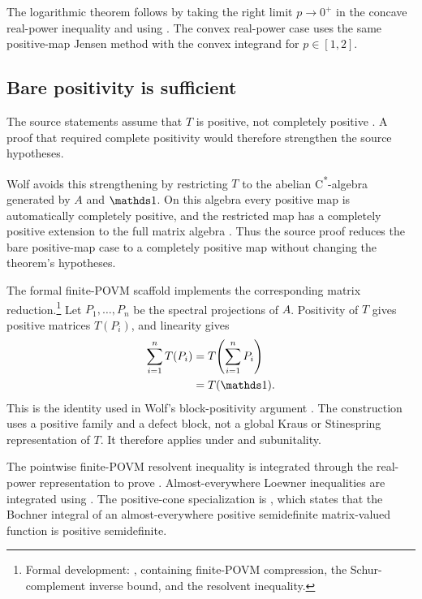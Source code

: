 \documentclass{article}
\begin{document}
The logarithmic theorem follows by taking the right limit $p\to 0^+$ in the
concave real-power inequality and using
. The convex real-power case uses the
same positive-map Jensen method with the convex integrand for $p\in[1,2]$.

\subsection{Bare positivity is sufficient}
\label{ssec:wolf_ch5_operator_jensen_lieb_bare_positivity}

The source statements assume that $T$ is positive, not completely positive
\cite[Corollary~5.2 and Theorems~5.10--5.13]{Wolf2012Quantum}. A proof that
required complete positivity would therefore strengthen the source
hypotheses.

Wolf avoids this strengthening by restricting $T$ to the abelian
C\textsuperscript{*}-algebra generated by $A$ and $\Id$. On this algebra every
positive map is automatically completely positive, and the restricted map has
a completely positive extension to the full matrix algebra
\cite[Propositions~1.6--1.7 and Theorems~5.10--5.13]{Wolf2012Quantum}. Thus
the source proof reduces the bare positive-map case to a completely positive
map without changing the theorem's hypotheses.

The formal finite-POVM scaffold implements the corresponding matrix
reduction.\footnote{Formal development:
, containing finite-POVM
compression, the Schur-complement inverse bound, and the resolvent inequality.}
Let $P_1,\ldots,P_n$ be the spectral projections of $A$. Positivity of $T$
gives positive matrices $T(P_i)$, and linearity gives
\begin{align}
    \sum_{i=1}^nT(P_i)
        &=T\!\left(\sum_{i=1}^nP_i\right)
    \label{eq:wolf_ch5_operator_jensen_lieb_povm_sum_first}\\
        &=T(\Id).
    \label{eq:wolf_ch5_operator_jensen_lieb_povm_sum_second}
\end{align}
This is the identity used in Wolf's block-positivity argument
\cite[Theorem~5.12]{Wolf2012Quantum}. The construction uses a positive family
and a defect block, not a global Kraus or Stinespring representation of $T$.
It therefore applies under  and subunitality.

The pointwise finite-POVM resolvent inequality
 is integrated through the real-power
representation to prove
. Almost-everywhere Loewner inequalities
are integrated using . The positive-cone
specialization is
, which states that
the Bochner integral of an almost-everywhere positive semidefinite
matrix-valued function is positive semidefinite.
\end{document}
